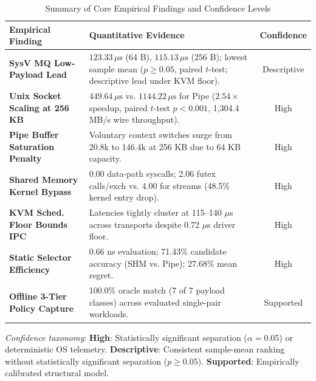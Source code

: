 \begin{table}[!t]
\centering
\caption{Summary of Core Empirical Findings and Confidence Levels}
\label{tab:summary_findings}
\scriptsize
\renewcommand{\arraystretch}{1.02}
\begin{tabular*}{\columnwidth}{@{\extracolsep{\fill}}p{2.6cm}p{3.8cm}c}
\toprule
\textbf{Empirical Finding} & \textbf{Quantitative Evidence} & \textbf{Confidence} \\
\midrule
\textbf{SysV MQ Low-Payload Lead} & $123.33\,\mu\text{s}$ (64 B), $115.13\,\mu\text{s}$ (256 B); lowest sample mean ($p \ge 0.05$, paired $t$-test; descriptive lead under KVM floor). & Descriptive \\
\addlinespace[1.5pt]
\textbf{Unix Socket Scaling at 256 KB} & $449.64\,\mu\text{s}$ vs. $1144.22\,\mu\text{s}$ for Pipe ($2.54\times$ speedup, paired $t$-test $p < 0.001$, 1,304.4 MB/s wire throughput). & High \\
\addlinespace[1.5pt]
\textbf{Pipe Buffer Saturation Penalty} & Voluntary context switches surge from 20.8k to 146.4k at 256 KB due to 64 KB capacity. & High \\
\addlinespace[1.5pt]
\textbf{Shared Memory Kernel Bypass} & 0.00 data-path syscalls; 2.06 futex calls/exch vs. 4.00 for streams (48.5\% kernel entry drop). & High \\
\addlinespace[1.5pt]
\textbf{KVM Sched. Floor Bounds IPC} & Latencies tightly cluster at 115--140 $\mu$s across transports despite 0.72 $\mu$s driver floor. & High \\
\addlinespace[1.5pt]
\textbf{Static Selector Efficiency} & 0.66 ns evaluation; 71.43\% candidate accuracy (SHM vs. Pipe); 27.68\% mean regret. & High \\
\addlinespace[1.5pt]
\textbf{Offline 3-Tier Policy Capture} & 100.0\% oracle match (7 of 7 payload classes) across evaluated single-pair workloads. & Supported \\
\bottomrule
\end{tabular*}
\vskip 1.5pt
{\tiny\noindent\emph{Confidence taxonomy}: \textbf{High}: Statistically significant separation ($\alpha = 0.05$) or deterministic OS telemetry. \textbf{Descriptive}: Consistent sample-mean ranking without statistically significant separation ($p \ge 0.05$). \textbf{Supported}: Empirically calibrated structural model.\par}
\end{table}
